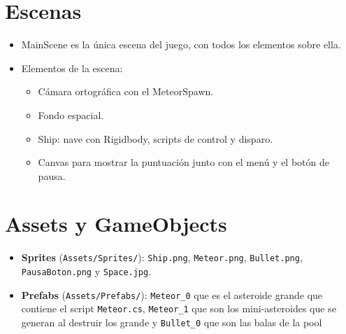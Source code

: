 \documentclass[12pt,twoside,letterpaper]{article}
\begin{document}



\newpage


\section{Escenas}

\begin{itemize}
    \item MainScene es la única escena del juego, con todos los elementos sobre ella.
    \item Elementos de la escena:
        \begin{itemize}
            \item Cámara ortográfica con el MeteorSpawn.
            \item Fondo espacial.
            \item Ship: nave con Rigidbody, scripts de control y disparo.
            \item Canvas para mostrar la puntuación junto con el menú y el botón de pausa.
        \end{itemize}
\end{itemize}

\section{Assets y GameObjects}

\begin{itemize}
    \item \textbf{Sprites} (\texttt{Assets/Sprites/}): \texttt{Ship.png}, \texttt{Meteor.png}, \texttt{Bullet.png}, \texttt{PausaBoton.png} y \texttt{Space.jpg}.
    \item \textbf{Prefabs} (\texttt{Assets/Prefabs/}): \texttt{Meteor\_0} que es el asteroide grande que contiene el script \texttt{Meteor.cs}, \texttt{Meteor\_1} que son los mini-asteroides que se generan al destruir los grande y \texttt{Bullet\_0} que son las balas de la pool
\end{itemize}
\end{document}
